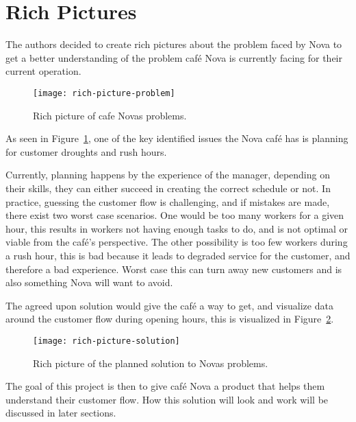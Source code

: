 \section{Rich Pictures}\label{sec:rich-pictures}

The authors decided to create rich pictures about the problem faced by Nova to get a better understanding
of the problem café Nova is currently facing for their current operation.
\begin{figure}[h]
    \centering
    \texttt{[image: rich-picture-problem]}
    \caption{Rich picture of cafe Novas problems.}\label{fig:rich-picture-problem}
\end{figure}
As seen in Figure~\ref{fig:rich-picture-problem}, one of the key identified issues the Nova café has is planning for
customer droughts and rush hours.

Currently, planning happens by the experience of the manager, depending on their skills, they can either
succeed in creating the correct schedule or not.
In practice, guessing the customer flow is challenging, and if mistakes are made, there exist two worst case scenarios.
One would be too many workers for a given hour, this results in workers not having enough tasks to do, and is not
optimal or viable from the café's perspective.
The other possibility is too few workers during a rush hour, this is bad because it leads to degraded service for the
customer, and therefore a bad experience.
Worst case this can turn away new customers and is also something Nova will want to avoid.

The agreed upon solution would give the café a way to get, and visualize data around the customer flow during
opening hours, this is visualized in Figure~\ref{fig:rich-picture-solution}.
\begin{figure}[h]
    \centering
    \texttt{[image: rich-picture-solution]}
    \caption{Rich picture of the planned solution to Novas problems.}\label{fig:rich-picture-solution}
\end{figure}
The goal of this project is then to give café Nova a product that helps them understand their customer flow.
How this solution will look and work will be discussed in later sections.
